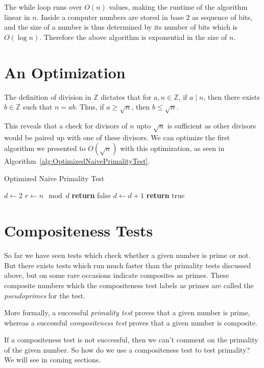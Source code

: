 \documentclass[11pt]{report}
\begin{document}
The while loop runs over $O(n)$ values, making the runtime of the algorithm linear in $n$. Inside a computer numbers are stored in base $2$ as sequence of bits, and the size of a number is thus determined by its number of bits which is $O(\log n)$. Therefore the above algorithm is exponential in the size of $n$.

\section{An Optimization}
The definition of division in $\mathbb{Z}$ dictates that for $a, n \in \mathbb{Z}$, if $a \mid n$, then there exists $b \in \mathbb{Z}$ such that $n = ab$. Thus, if $a \geq \sqrt n$, then $b \leq \sqrt n$. 

 This reveals that a check for divisors of $n$ upto $\sqrt n$ is sufficient as other divisors would be paired up with one of these divisors. We can optimize the first algorithm we presented to $O(\sqrt n)$ with this optimization, as seen in Algorithm~\ref{alg:OptimizedNaivePrimalityTest}.
 
\begin{algorithm}
\caption{Optimized Naive Primality Test}
\label{alg:OptimizedNaivePrimalityTest}
\begin{algorithmic}
\State $d\gets 2$
\State $r\gets n \mod d$
	\State \textbf{return} false 
\EndIf
\State $d \gets d+1$
\EndWhile
\State \textbf{return} true 
\EndProcedure
\end{algorithmic}
\end{algorithm}

\section{Compositeness Tests}
So far we have seen tests which check whether a given number is prime or not. But there exists tests which run much faster than the primality tests discussed above, but on some rare occasions indicate composites as primes. These composite numbers which the compositeness test labels as primes are called the \emph{pseudoprimes} for the test.

More formally, a successful \emph{primality test} proves that a given number is prime, whereas a successful \emph{compositeness test} proves that a given number is composite. 

If a compositeness test is not successful, then we can't comment on the primality of the given number. So how do we use a compositeness test to test primality? We will see in coming sections.
\end{document}
